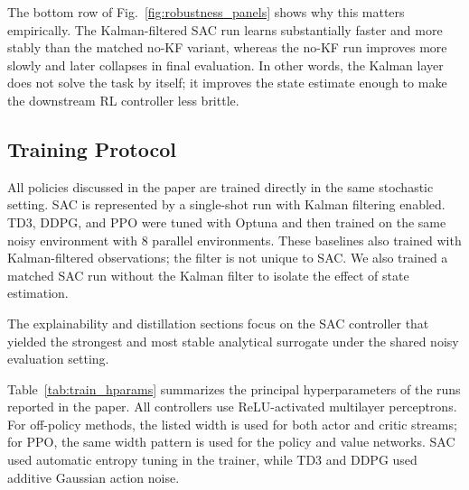 \documentclass[runningheads]{llncs}
\begin{document}
The bottom row of Fig.~\ref{fig:robustness_panels} shows why this matters empirically. The Kalman-filtered SAC run learns substantially faster and more stably than the matched no-KF variant, whereas the no-KF run improves more slowly and later collapses in final evaluation. In other words, the Kalman layer does not solve the task by itself; it improves the state estimate enough to make the downstream RL controller less brittle.

\subsection{Training Protocol}
All policies discussed in the paper are trained directly in the same stochastic setting. SAC is represented by a single-shot run with Kalman filtering enabled. TD3, DDPG, and PPO were tuned with Optuna and then trained on the same noisy environment with 8 parallel environments. These baselines also trained with Kalman-filtered observations; the filter is not unique to SAC. We also trained a matched SAC run without the Kalman filter to isolate the effect of state estimation.

The explainability and distillation sections focus on the SAC controller that yielded the strongest and most stable analytical surrogate under the shared noisy evaluation setting.

Table~\ref{tab:train_hparams} summarizes the principal hyperparameters of the runs reported in the paper. All controllers use ReLU-activated multilayer perceptrons. For off-policy methods, the listed width is used for both actor and critic streams; for PPO, the same width pattern is used for the policy and value networks. SAC used automatic entropy tuning in the trainer, while TD3 and DDPG used additive Gaussian action noise.
\end{document}
